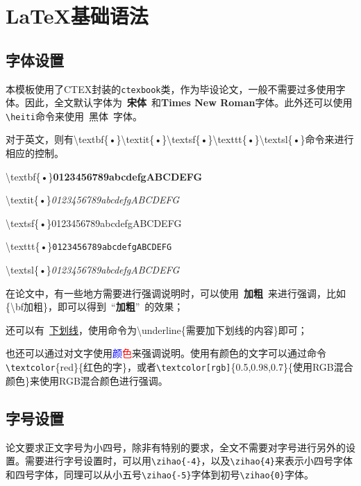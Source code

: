 \chapter{\label{chapter-yufa}\LaTeX{}基础语法}
\section{字体设置}
本模板使用了CTEX封装的\texttt{ctexbook}类，作为毕设论文，一般不需要过多使用字体。因此，全文默认字体为~{\bf 宋体}~和{\bf Times New Roman}字体。此外还可以使用\texttt{\textbackslash heiti}命令来使用~{\heiti 黑体}~字体。\par
对于英文，则有\textbackslash textbf\{•\}\quad\textbackslash textit\{•\}\quad\textbackslash textsf\{•\}\quad\textbackslash texttt\{•\}\quad\textbackslash textsl\{•\}命令来进行相应的控制。\par
{\textbackslash textbf\{•\}\qquad\textbf{0123456789abcdefgABCDEFG}}\par
{\textbackslash textit\{•\}\qquad\textit{0123456789abcdefgABCDEFG}}\par
{\textbackslash textsf\{•\}\qquad\textsf{0123456789abcdefgABCDEFG}}\par
{\textbackslash texttt\{•\}\qquad\texttt{0123456789abcdefgABCDEFG}}\par
{\textbackslash textsl\{•\}\qquad\textsl{0123456789abcdefgABCDEFG}}\par
在论文中，有一些地方需要进行强调说明时，可以使用~{\bf 加粗}~来进行强调，比如\{\textbackslash bf加粗\}，即可以得到~“{\bf 加粗}”~的效果；\par
还可以有~\underline{下划线}，使用命令为\textbackslash underline\{需要加下划线的内容\}即可；\par
也还可以通过对文字使用\textcolor{blue}{颜}\textcolor{red}{色}来强调说明。使用\textcolor[rgb]{0.5,0.95,0.96}{有颜色的文字}可以通过命令\texttt{\textbackslash textcolor}\{red\}\{红色的字\}，或者\texttt{\textbackslash textcolor[rgb]}\{0.5,0.98,0.7\}\{使用RGB混合颜色\}来\textcolor[rgb]{0.5,0.98,0.7}{使用RGB混合颜色}进行强调。
\section{字号设置}
论文要求正文字号为小四号，除非有特别的要求，全文不需要对字号进行另外的设置。需要进行字号设置时，可以用\texttt{\textbackslash zihao\{-4\}}，以及\texttt{\textbackslash zihao\{4\}}来表示小四号字体和四号字体，同理可以从小五号\texttt{\textbackslash zihao\{-5\}}字体到初号\texttt{\textbackslash zihao\{0\}}字体。\par
